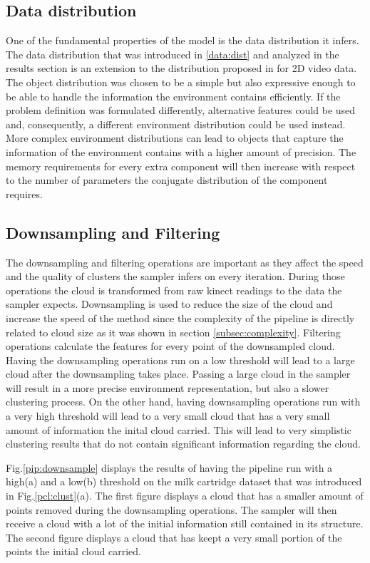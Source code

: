 \documentclass[twoside,hidelinks]{article}
\begin{document}
 
\subsection{Data distribution}

One of the fundamental properties of the model is the data distribution it infers. 
The data distribution that was introduced in \ref{data:dist} and analyzed in the results section is an extension to the distribution proposed in \cite{dependentDiri} for 2D video data.
The object distribution was chosen to be a simple but also expressive enough to be able to handle the information the environment contains efficiently.
If the problem definition was formulated differently, alternative features could be used and, consequently, a different environment distribution could be used instead.
More complex environment distributions can lead to objects that capture the information of the environment contains with a higher amount of precision. 
The memory requirements for every extra component will then increase with respect to the number of parameters the conjugate distribution of the component requires. 

 
\subsection{Downsampling and Filtering}

The downsampling and filtering operations are important as they affect the speed and the quality of clusters the sampler infers on every iteration. 
During those operations the cloud is transformed from raw kinect readings to the data the sampler expects.
Downsampling is used to reduce the size of the cloud and increase the speed of the method since the complexity of the pipeline is directly related to cloud size as it was shown in section \ref{subsec:complexity}. Filtering operations calculate the features for every point of the downsampled cloud.
Having the downsampling operations run on a low threshold will lead to a large cloud after the downsampling takes place. 
Passing a large cloud in the sampler will result in a more precise environment representation, but also a slower clustering process.
On the other hand, having downsampling operations run with a very high threshold will lead to a very small cloud that has a very small amount of information the inital cloud carried. This will lead to very simplistic clustering results that do not contain significant information regarding the cloud.

Fig.\ref{pip:downsample} displays the results of having the pipeline run with a high(a) and a low(b) threshold on the milk cartridge dataset that was introduced in Fig.\ref{pcl:clust}(a).
The first figure displays a cloud that has a smaller amount of points removed during the downsampling operations. The sampler will then receive a cloud with a lot of the initial information still contained in its structure.
The second figure displays a cloud that has keept a very small portion of the points the initial cloud carried.
\end{document}
